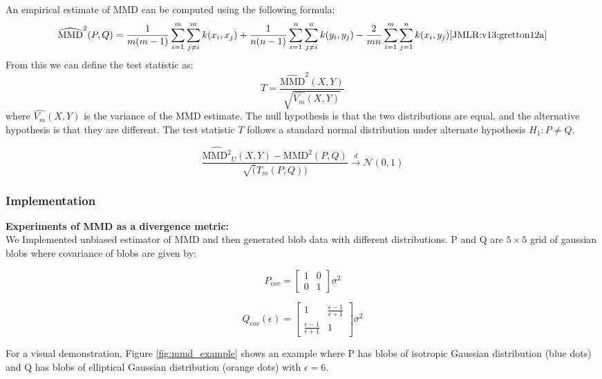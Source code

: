 \documentclass{article}
\begin{document}
An empirical estimate of MMD can be computed using the following formula:
\[
  \widehat{\text{MMD}}^2(P, Q) = \frac{1}{m(m-1)} \sum_{i=1}^{m} \sum_{j \neq i}^{m} k(x_i, x_j) + \frac{1}{n(n-1)} \sum_{i=1}^{n} \sum_{j \neq i}^{n} k(y_i, y_j) - \frac{2}{mn} \sum_{i=1}^{m} \sum_{j=1}^{n} k(x_i, y_j)\cite{JMLR:v13:gretton12a}
\]
From this we can define the test statistic as:
\[
  T = \frac{\widehat{\text{MMD}}^2(X,Y)}{\sqrt{\hat{V_m}(X,Y)}}
\]
where \(\widehat{V_m}(X,Y)\) is the variance of the MMD estimate. The null hypothesis is that the two distributions are equal, and the alternative hypothesis is that they are different. The test statistic \(T\) follows a standard normal distribution under alternate hypothesis \(H_1: P \neq Q\).

\[
  \frac{\widehat{\text{MMD}^2}_U(X,Y) - \text{MMD}^2(P,Q)}{\sqrt(T_m(P,Q))} \xrightarrow{d} \mathcal{N}(0,1)
\]

\subsubsection{Implementation}
\textbf{Experiments of MMD as a divergence metric:}\\
We Implemented unbiased estimator of MMD and then generated blob data with different distributions. P and Q are \(5 \times 5\) grid of gaussian blobs where covariance of blobs are given by: \\
\begin{minipage}{0.45\linewidth}
\[
  P_{cov} = \begin{bmatrix}
    1 & 0 \\
    0 & 1
  \end{bmatrix}\sigma^2
\]
\end{minipage}
\hfill
\begin{minipage}{0.45\linewidth}
\[
  Q_{cov}(\epsilon) = \begin{bmatrix}
    1 & \frac{\epsilon-1}{\epsilon+1} \\
    \frac{\epsilon-1}{\epsilon+1} & 1
  \end{bmatrix} \sigma^2
\]
\end{minipage}

For a visual demonstration, Figure \ref{fig:mmd_example} shows an example where P has blobs of isotropic Gaussian distribution (blue dots) and Q has blobs of elliptical Gaussian distribution (orange dots) with \(\epsilon = 6\). 
\end{document}

